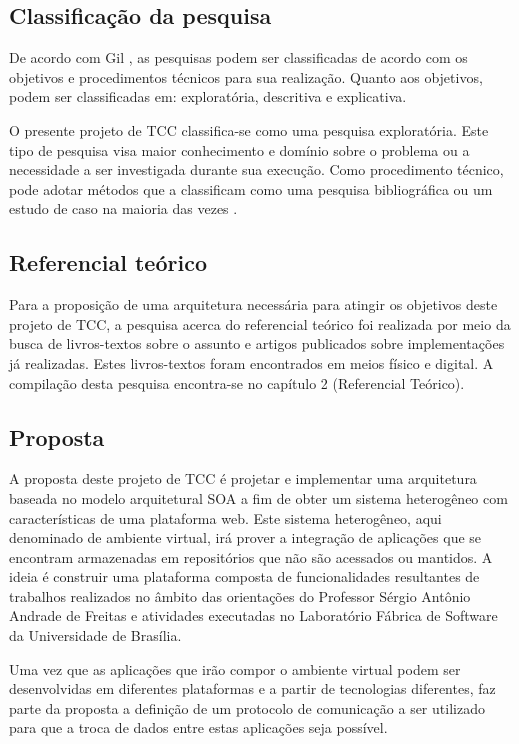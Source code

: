 \subsection{Classificação da pesquisa}
De acordo com Gil \cite{gil_como_2008}, as pesquisas podem ser classificadas de acordo com os objetivos e procedimentos técnicos para sua realização. Quanto aos objetivos, podem ser classificadas em: exploratória, descritiva e explicativa. 

O presente projeto de TCC classifica-se como uma pesquisa exploratória. Este tipo de pesquisa visa maior conhecimento e domínio sobre o problema ou a necessidade a ser investigada durante sua execução. Como procedimento técnico, pode adotar métodos que a classificam como uma pesquisa bibliográfica ou um estudo de caso na maioria das vezes \cite{gil_como_2008}.

\subsection{Referencial teórico}
Para a proposição de uma arquitetura necessária para atingir os objetivos deste projeto de TCC, a pesquisa acerca do referencial teórico foi realizada por meio da busca de livros-textos sobre o assunto e artigos publicados sobre implementações já realizadas. Estes livros-textos foram encontrados em meios físico e digital. A compilação desta pesquisa encontra-se no capítulo 2 (Referencial Teórico).

\subsection{Proposta}
A proposta deste projeto de TCC é projetar e implementar uma arquitetura baseada no modelo arquitetural SOA a fim de obter um sistema heterogêneo com características de uma plataforma web. Este sistema heterogêneo, aqui denominado de ambiente virtual, irá prover a integração de aplicações que se encontram armazenadas em repositórios que não são acessados ou mantidos. A ideia é construir uma plataforma composta de funcionalidades resultantes de trabalhos realizados no âmbito das orientações do Professor Sérgio Antônio Andrade de Freitas e atividades executadas no Laboratório Fábrica de Software da Universidade de Brasília.

Uma vez que as aplicações que irão compor o ambiente virtual podem ser desenvolvidas em diferentes plataformas e a partir de tecnologias diferentes, faz parte da proposta a definição de um protocolo de comunicação a ser utilizado para que a troca de dados entre estas aplicações seja possível.

